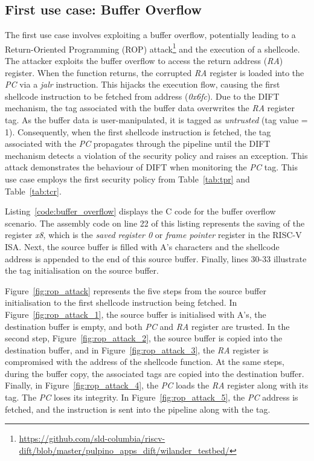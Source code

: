 \subsection{First use case: Buffer Overflow}
The first use case involves exploiting a buffer overflow, potentially leading to a Return-Oriented Programming (ROP) attack\footnote{\url{https://github.com/sld-columbia/riscv-dift/blob/master/pulpino\_apps\_dift/wilander\_testbed/}} and the execution of a shellcode. The attacker exploits the buffer overflow to access the return address (\textit{RA}) register. When the function returns, the corrupted \textit{RA} register is loaded into the \textit{PC} via a \textit{jalr} instruction. This hijacks the execution flow, causing the first shellcode instruction to be fetched from address (\textit{0x6fc}). Due to the DIFT mechanism, the tag associated with the buffer data overwrites the \textit{RA} register tag. As the buffer data is user-manipulated, it is tagged as \textit{untrusted} (tag value = 1). Consequently, when the first shellcode instruction is fetched, the tag associated with the \textit{PC} propagates through the pipeline until the DIFT mechanism detects a violation of the security policy and raises an exception. This attack demonstrates the behaviour of DIFT when monitoring the \textit{PC} tag. This use case employs the first security policy from Table~\ref{tab:tpr} and Table~\ref{tab:tcr}.

Listing~\ref{code:buffer_overflow} displays the C code for the buffer overflow scenario. The assembly code on line 22 of this listing represents the saving of the register \textit{x8}, which is the \textit{saved register 0} or \textit{frame pointer} register in the RISC-V ISA. Next, the source buffer is filled with A's characters and the shellcode address is appended to the end of this source buffer. Finally, lines 30-33 illustrate the tag initialisation on the source buffer.

Figure~\ref{fig:rop_attack} represents the five steps from the source buffer initialisation to the first shellcode instruction being fetched. In Figure~\ref{fig:rop_attack_1}, the source buffer is initialised with A's, the destination buffer is empty, and both \textit{PC} and \textit{RA} register are trusted. In the second step, Figure~\ref{fig:rop_attack_2}, the source buffer is copied into the destination buffer, and in Figure~\ref{fig:rop_attack_3}, the \textit{RA} register is compromised with the address of the shellcode function. At the same steps, during the buffer copy, the associated tags are copied into the destination buffer. Finally, in Figure~\ref{fig:rop_attack_4}, the \textit{PC} loads the \textit{RA} register along with its tag. The \textit{PC} loses its integrity. In Figure~\ref{fig:rop_attack_5}, the \textit{PC} address is fetched, and the instruction is sent into the pipeline along with the tag.

